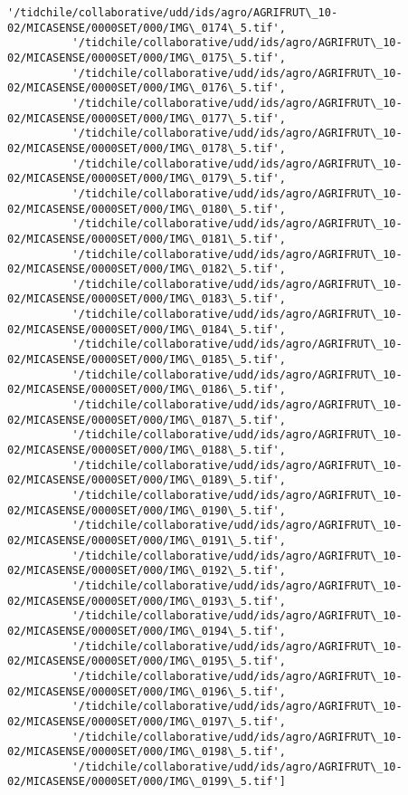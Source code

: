 \documentclass[11pt]{article}
\begin{document}
\begin{Verbatim}[commandchars=\\\{\}]
          '/tidchile/collaborative/udd/ids/agro/AGRIFRUT\_10-02/MICASENSE/0000SET/000/IMG\_0174\_5.tif',
          '/tidchile/collaborative/udd/ids/agro/AGRIFRUT\_10-02/MICASENSE/0000SET/000/IMG\_0175\_5.tif',
          '/tidchile/collaborative/udd/ids/agro/AGRIFRUT\_10-02/MICASENSE/0000SET/000/IMG\_0176\_5.tif',
          '/tidchile/collaborative/udd/ids/agro/AGRIFRUT\_10-02/MICASENSE/0000SET/000/IMG\_0177\_5.tif',
          '/tidchile/collaborative/udd/ids/agro/AGRIFRUT\_10-02/MICASENSE/0000SET/000/IMG\_0178\_5.tif',
          '/tidchile/collaborative/udd/ids/agro/AGRIFRUT\_10-02/MICASENSE/0000SET/000/IMG\_0179\_5.tif',
          '/tidchile/collaborative/udd/ids/agro/AGRIFRUT\_10-02/MICASENSE/0000SET/000/IMG\_0180\_5.tif',
          '/tidchile/collaborative/udd/ids/agro/AGRIFRUT\_10-02/MICASENSE/0000SET/000/IMG\_0181\_5.tif',
          '/tidchile/collaborative/udd/ids/agro/AGRIFRUT\_10-02/MICASENSE/0000SET/000/IMG\_0182\_5.tif',
          '/tidchile/collaborative/udd/ids/agro/AGRIFRUT\_10-02/MICASENSE/0000SET/000/IMG\_0183\_5.tif',
          '/tidchile/collaborative/udd/ids/agro/AGRIFRUT\_10-02/MICASENSE/0000SET/000/IMG\_0184\_5.tif',
          '/tidchile/collaborative/udd/ids/agro/AGRIFRUT\_10-02/MICASENSE/0000SET/000/IMG\_0185\_5.tif',
          '/tidchile/collaborative/udd/ids/agro/AGRIFRUT\_10-02/MICASENSE/0000SET/000/IMG\_0186\_5.tif',
          '/tidchile/collaborative/udd/ids/agro/AGRIFRUT\_10-02/MICASENSE/0000SET/000/IMG\_0187\_5.tif',
          '/tidchile/collaborative/udd/ids/agro/AGRIFRUT\_10-02/MICASENSE/0000SET/000/IMG\_0188\_5.tif',
          '/tidchile/collaborative/udd/ids/agro/AGRIFRUT\_10-02/MICASENSE/0000SET/000/IMG\_0189\_5.tif',
          '/tidchile/collaborative/udd/ids/agro/AGRIFRUT\_10-02/MICASENSE/0000SET/000/IMG\_0190\_5.tif',
          '/tidchile/collaborative/udd/ids/agro/AGRIFRUT\_10-02/MICASENSE/0000SET/000/IMG\_0191\_5.tif',
          '/tidchile/collaborative/udd/ids/agro/AGRIFRUT\_10-02/MICASENSE/0000SET/000/IMG\_0192\_5.tif',
          '/tidchile/collaborative/udd/ids/agro/AGRIFRUT\_10-02/MICASENSE/0000SET/000/IMG\_0193\_5.tif',
          '/tidchile/collaborative/udd/ids/agro/AGRIFRUT\_10-02/MICASENSE/0000SET/000/IMG\_0194\_5.tif',
          '/tidchile/collaborative/udd/ids/agro/AGRIFRUT\_10-02/MICASENSE/0000SET/000/IMG\_0195\_5.tif',
          '/tidchile/collaborative/udd/ids/agro/AGRIFRUT\_10-02/MICASENSE/0000SET/000/IMG\_0196\_5.tif',
          '/tidchile/collaborative/udd/ids/agro/AGRIFRUT\_10-02/MICASENSE/0000SET/000/IMG\_0197\_5.tif',
          '/tidchile/collaborative/udd/ids/agro/AGRIFRUT\_10-02/MICASENSE/0000SET/000/IMG\_0198\_5.tif',
          '/tidchile/collaborative/udd/ids/agro/AGRIFRUT\_10-02/MICASENSE/0000SET/000/IMG\_0199\_5.tif']
\end{Verbatim}
            
\end{document}
